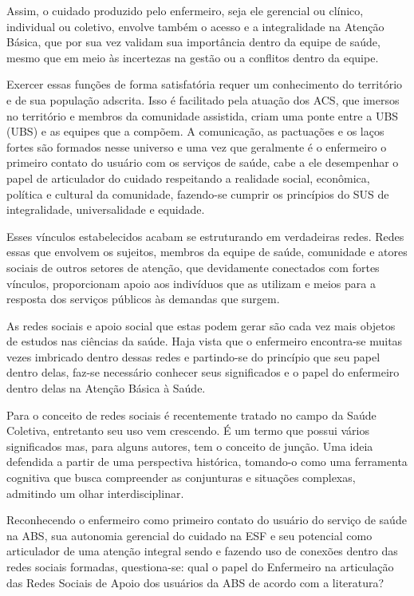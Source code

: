 Assim, o cuidado produzido pelo enfermeiro, seja ele gerencial ou clínico, individual ou coletivo, envolve também o acesso e a integralidade na Atenção Básica, que por sua vez validam sua importância dentro da equipe de saúde, mesmo que em meio às incertezas na gestão ou a conflitos dentro da equipe. \cite{matumoto2011pratica, weirich2009trabalho, heringer2007praticas, david2009organizaccao}

Exercer essas funções de forma satisfatória requer um conhecimento do território e de sua população adscrita. Isso é facilitado pela atuação dos \acrshort{ACS}, que imersos no território e membros da comunidade assistida, criam uma ponte entre a \acrshort{UBS} (\acrlong{UBS}) e as equipes que a compõem. A comunicação, as pactuações e os laços fortes são formados nesse universo e uma vez que geralmente é o enfermeiro o primeiro contato do usuário com os serviços de saúde, cabe a ele desempenhar o papel de articulador do cuidado respeitando a realidade social, econômica, política e cultural da comunidade, fazendo-se cumprir os princípios do \acrshort{SUS} de integralidade, universalidade e equidade. 

Esses vínculos estabelecidos acabam se estruturando em verdadeiras redes. Redes essas que envolvem os sujeitos, membros da equipe de saúde, comunidade e atores sociais de outros setores de atenção, que devidamente conectados com fortes vínculos, proporcionam apoio aos indivíduos que as utilizam e meios para a resposta dos serviços públicos às demandas que surgem. 

As redes sociais e apoio social que estas podem gerar são cada vez mais objetos de estudos nas ciências da saúde. Haja vista que o enfermeiro encontra-se muitas vezes imbricado dentro dessas redes e partindo-se do princípio que seu papel dentro delas, faz-se necessário conhecer seus significados e o papel do enfermeiro dentro delas na Atenção Básica à Saúde. 

Para \cite{marteleto2009informaccao} o conceito de redes sociais é recentemente tratado no campo da Saúde Coletiva, entretanto seu uso vem crescendo. É um termo que possui vários significados mas, para alguns autores, tem o conceito de junção. Uma ideia defendida a partir de uma perspectiva histórica, tomando-o como uma ferramenta cognitiva que busca compreender as conjunturas e situações complexas, admitindo um olhar interdisciplinar.

Reconhecendo o enfermeiro como primeiro contato do usuário do serviço de saúde na \acrshort{ABS}, sua autonomia gerencial do cuidado na \acrshort{ESF} e seu potencial como articulador de uma atenção integral sendo e fazendo uso de conexões dentro das redes sociais formadas, questiona-se: qual o papel do Enfermeiro na articulação das Redes Sociais de Apoio dos usuários da \acrshort{ABS} de acordo com a literatura?

